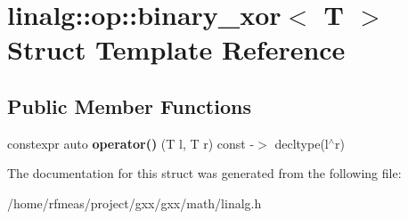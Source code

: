 \hypertarget{structlinalg_1_1op_1_1binary__xor}{}\section{linalg\+:\+:op\+:\+:binary\+\_\+xor$<$ T $>$ Struct Template Reference}
\label{structlinalg_1_1op_1_1binary__xor}
\subsection*{Public Member Functions}
\begin{DoxyCompactItemize}
\item 
constexpr auto {\bfseries operator()} (T l, T r) const -\/$>$ decltype(l$^\wedge$r)\hypertarget{structlinalg_1_1op_1_1binary__xor_a8fafc8173f9d09ab122c5323a3dacde5}{}\label{structlinalg_1_1op_1_1binary__xor_a8fafc8173f9d09ab122c5323a3dacde5}

\end{DoxyCompactItemize}


The documentation for this struct was generated from the following file\+:\begin{DoxyCompactItemize}
\item 
/home/rfmeas/project/gxx/gxx/math/linalg.\+h\end{DoxyCompactItemize}

